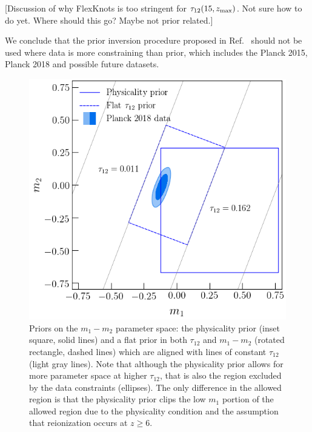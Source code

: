 \documentclass[prd,twocolumn,amsmath,amssymb,floatfix,superscriptaddress,nofootinbib]{revtex4-1}
\newcommand{\zmax}{z_{\rm max}}
\begin{document}
[Discussion of why FlexKnots is too stringent for $\tau_{12}(15, \zmax)$. Not sure how to do yet. Where should this go? Maybe not prior related.]

We conclude that the prior inversion procedure proposed in Ref.~\cite{Millea:2018bko} should not be used where data is more constraining than prior, which includes the Planck 2015, Planck 2018 and possible future datasets.  

 \begin{figure}
          \includegraphics[width=0.9\columnwidth]{paper/plots/pl18_pc_zmax30_pliklite_srollv2_plot_rotated_box_flat_tau_prior_fac_0.8.png}
          \caption {Priors on the $m_1-m_2$ parameter space: the physicality prior (inset square, solid lines) and a flat prior in
          both $\tau_{12}$ and $m_1-m_2$ (rotated rectangle, dashed lines) which are aligned with lines of constant $\tau_{12}$ (light gray lines). Note that although the physicality prior allows for more parameter space at higher $\tau_{12}$, that is also the region excluded by the data constraints (ellipses). The only difference in the allowed region is that the physicality prior clips the low $m_1$ portion of the allowed region due to the physicality condition and the assumption that reionization occurs at $z\ge 6$.} 
          \label{fig:prior_box}
\end{figure}


\end{document}
